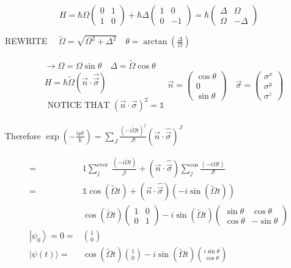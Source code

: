 \documentclass[10pt]{article}
\begin{document}
$$
H=\hbar \Omega\left(\begin{array}{ll}
0 & 1 \\
1 & 0
\end{array}\right)+\hbar \Delta\left(\begin{array}{cc}
1 & 0 \\
0 & -1
\end{array}\right)=\hbar\left(\begin{array}{cc}
\Delta & \Omega \\
\Omega & -\Delta
\end{array}\right)
$$

REWRITE $\quad \widetilde{\Omega}=\sqrt{\Omega^{2}+\Delta^{2}} \quad \theta=\arctan \left(\frac{\Delta}{\Omega}\right)$

$$
\begin{aligned}
& \rightarrow \Omega=\Omega \sin \theta \quad \Delta=\tilde{\Omega} \cos \theta \\
& H=\hbar \widetilde{\Omega}(\vec{n} \cdot \overrightarrow{\vec{\sigma}}) \\
& \text { NOTICE THAT }(\vec{n} \cdot \vec{\sigma})^{2}=\mathbb{1}
\end{aligned} \vec{n}=\left(\begin{array}{c}
\cos \theta \\
0 \\
\sin \theta
\end{array}\right) \quad \vec{\sigma}=\left(\begin{array}{c}
\sigma^{x} \\
\sigma^{y} \\
\sigma^{z}
\end{array}\right)
$$

Therefore $\exp \left(-\frac{i \mu t}{\hbar}\right)=\sum_{J} \frac{(-i \tilde{\Omega} t)^{j}}{J!}(\vec{n} \cdot \hat{\vec{\sigma}})^{J}$

$$
\begin{aligned}
= & 1 \sum_{j}^{\text {ever }} \frac{(-i \tilde{\Omega} t)}{j!}+(\vec{n} \cdot \hat{\vec{\sigma}}) \sum_{j}^{\cos } \frac{(-i \Omega t)}{J!} \\
= & \mathbb{1} \cos (\tilde{\Omega} t)+(\vec{n} \cdot \hat{\vec{\sigma}})(-i \sin (\tilde{\Omega} t)) \\
& \cos (\tilde{\Omega} t)\left(\begin{array}{cc}
1 & 0 \\
0 & 1
\end{array}\right)-i \sin (\tilde{\Omega} t)\left(\begin{array}{cc}
\sin \theta & \cos \theta \\
\cos \theta & -\sin \theta
\end{array}\right) \\
\left|\psi_{0}\right\rangle=0= & \binom{1}{0} \\
|\psi(t)\rangle= & \cos (\tilde{\Omega} t)\binom{1}{0}-i \sin (\tilde{\Omega} t)\binom{i \sin \theta}{\cos \theta}
\end{aligned}
$$
\end{document}
